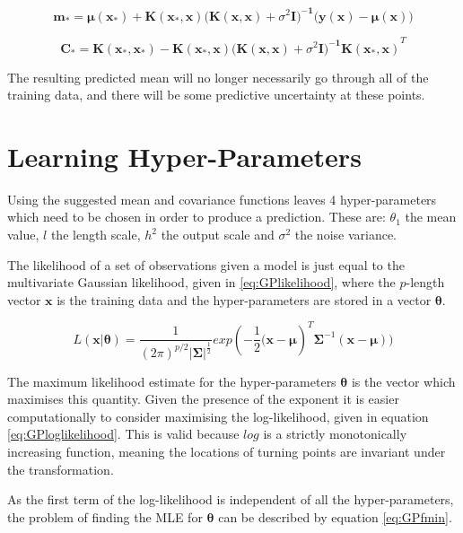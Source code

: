 \documentclass[a4paper,11pt]{report}
\begin{document}
\singlespacing


\begin{equation} \label{eq:GP+noisemean}
\mathbf{m_*} = \boldsymbol{\mu} \mathbf{(x_*) + K(x_* ,x) (K(x,x)}+\sigma^2 \mathbf{I)^{-1} (y(x)} - \boldsymbol{\mu} \mathbf{(x))}
\end{equation}

\begin{equation} \label{eq:GP+noisevar}
\mathbf{ C_* = K(x_*,x_*)-K(x_*,x) (K(x,x)}+\sigma^2 \mathbf{I)^{-1} K(x_*,x)}^{T}
\end{equation}

\doublespacing

The resulting predicted mean will no longer necessarily go through all of the training data, and there will be some predictive uncertainty at these points.

\section{Learning Hyper-Parameters}
Using the suggested mean and covariance functions leaves 4 hyper-parameters which need to be chosen in order to produce a prediction. These are: \(\theta_1\) the mean value, \(l\) the length scale, \(h^2\) the output scale and \(\sigma^2\) the noise variance. 

The likelihood of a set of observations given a model is just equal to the multivariate Gaussian likelihood, given in \ref{eq:GPlikelihood}, where the \(p\)-length vector \(\mathbf{x}\) is the training data and the hyper-parameters are stored in a vector \(\mathbf{\theta}\).

\begin{equation} \label{eq:GPlikelihood}
L(\mathbf{x | \theta}) = \frac{1}{(2\pi)^{p/2} |\boldsymbol{\Sigma|}^{\frac{1}{2}}} exp(- \frac{1}{2} \mathbf{(x}-\boldsymbol{\mu})^{T}\boldsymbol{\Sigma}^{-1}(\mathbf{x}-\boldsymbol{\mu}))
\end{equation}

The maximum likelihood estimate for the hyper-parameters \(\mathbf{\theta}\) is the vector which maximises this quantity. Given the presence of the exponent it is easier computationally to consider maximising the log-likelihood, given in equation \ref{eq:GPloglikelihood}. This is valid because \(log\) is a strictly monotonically increasing function, meaning the locations of turning points are invariant under the transformation. \par
As the first term of the log-likelihood is independent of all the hyper-parameters, the problem of finding the MLE for \(\boldsymbol{\theta}\) can be described by equation \ref{eq:GPfmin}.
\end{document}
